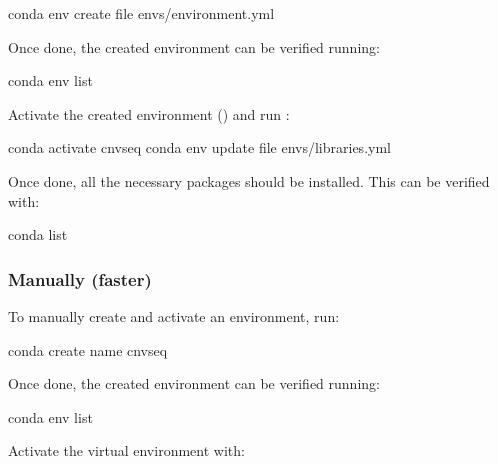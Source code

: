 \documentclass[letterpaper,10pt,english]{sphinxhowto}
\begin{document}
\begin{sphinxVerbatim}[commandchars=\\\{\}]
\PYGZdl{} conda env create \PYGZhy{}\PYGZhy{}file envs/environment.yml
\end{sphinxVerbatim}

\sphinxAtStartPar
Once done, the created environment can be verified running:

\begin{sphinxVerbatim}[commandchars=\\\{\}]
\PYGZdl{} conda env list
\end{sphinxVerbatim}

\sphinxAtStartPar
Activate the created environment () and run :

\begin{sphinxVerbatim}[commandchars=\\\{\}]
\PYGZdl{} conda activate cnv\PYGZhy{}seq
\PYGZdl{} conda env update \PYGZhy{}\PYGZhy{}file envs/libraries.yml
\end{sphinxVerbatim}

\sphinxAtStartPar
Once done, all the necessary packages should be installed. This can be verified with:

\begin{sphinxVerbatim}[commandchars=\\\{\}]
\PYGZdl{} conda list
\end{sphinxVerbatim}


\subsubsection{Manually (faster)}
\label{\detokenize{index:manually-faster}}
\sphinxAtStartPar
To manually create and activate an environment, run:

\begin{sphinxVerbatim}[commandchars=\\\{\}]
\PYGZdl{} conda create \PYGZhy{}\PYGZhy{}name cnv\PYGZhy{}seq
\end{sphinxVerbatim}

\sphinxAtStartPar
Once done, the created environment can be verified running:

\begin{sphinxVerbatim}[commandchars=\\\{\}]
\PYGZdl{} conda env list
\end{sphinxVerbatim}

\sphinxAtStartPar
Activate the virtual environment with:
\end{document}

